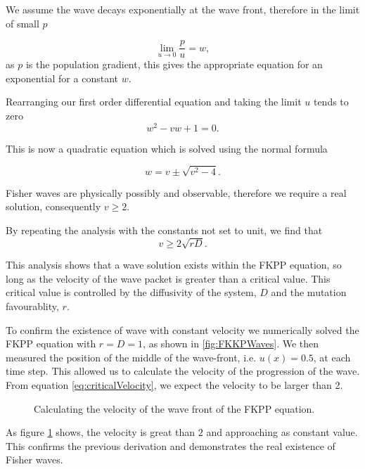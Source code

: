 \documentclass[12pt, a4paper,]{article}
\begin{document}
We assume the wave decays exponentially at the wave front, therefore in the limit of small $p$

\begin{equation}
\lim_{u \rightarrow 0} \frac{p}{u} = w,
\label{eq:waveFrontExp}
\end{equation} 
as $p$ is the population gradient, this gives the appropriate equation for an exponential for a constant $w$. 

Rearranging our first order differential equation and taking the limit $u$ tends to zero
\begin{equation}
w ^ 2 - vw + 1  = 0.
\end{equation}

This is now a quadratic equation which is solved using the normal formula 

\begin{equation}
w = v \pm \sqrt{v^2 - 4}.
\end{equation}

Fisher waves are physically possibly and observable, therefore we require a real solution, consequently $v \geq 2$. 

By repeating the analysis with the constants not set to unit, we find that 
\begin{equation}
v \geq 2 \sqrt{rD}. 
\label{eq:criticalVelocity}
\end{equation}

This analysis shows that a wave solution exists within the FKPP equation, so long as the velocity of the wave packet is greater than a critical value. This critical value is controlled by the diffusivity of the system, $D$ and the  mutation favourablity, $r$. 

To confirm the existence of wave with constant velocity we numerically solved the FKPP equation with $r=D=1$, as shown in \ref{fig:FKKPWaves}. We then measured the position of the middle of the wave-front, i.e. $u(x) = 0.5$, at each time step. This allowed us to calculate the velocity of the progression of the wave. From equation \eqref{eq:criticalVelocity}, we expect the velocity to be larger than 2. 

\begin{figure}[h]
\centering

\caption{Calculating the velocity of the wave front of the FKPP equation. }
\label{fig:FKKPVelocity}
\end{figure}

As figure \ref{fig:FKKPVelocity} shows, the velocity is great than $2$ and approaching as constant value. This confirms the previous derivation and demonstrates the real existence of Fisher waves. 
\end{document}
